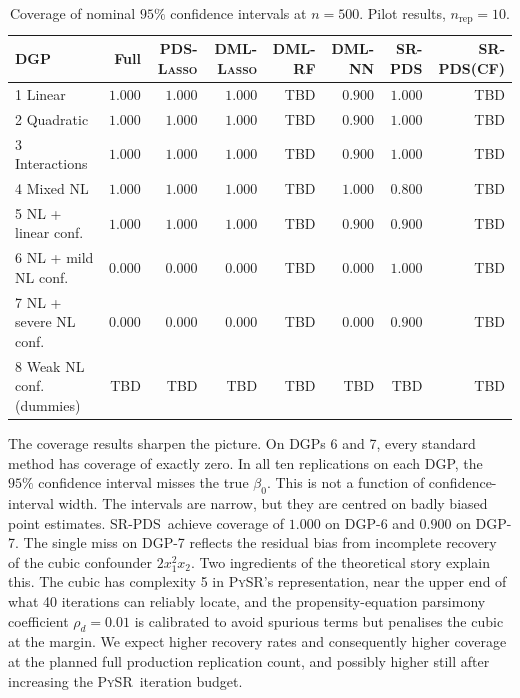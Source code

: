 \documentclass[11pt, a4paper]{article}
\theoremstyle{plain}
\theoremstyle{definition}
\theoremstyle{remark}
\newcommand{\hl}[1]{\cellcolor{highlight}#1}
\newcommand{\lasso}{\textsc{Lasso}}
\newcommand{\pds}{\textsc{PDS}}
\newcommand{\dml}{\textsc{DML}}
\newcommand{\pysr}{\textsc{PySR}}
\newcommand{\epds}{\textsc{SR-PDS}}
\begin{document}
\begin{table}[H]
\centering
\caption{Coverage of nominal $95\%$ confidence intervals at
$n=500$. Pilot results, $n_{\text{rep}} = 10$.}
\label{tab:coverage}
\small
\setlength{\tabcolsep}{4pt}
\begin{tabular}{lrrrrrrr}
    \toprule
    DGP
        & Full
        & \pds-\lasso
        & \dml-\lasso
        & \dml-RF
        & \dml-NN
        & \epds
        & \epds (CF) \\
    \midrule
    1 Linear
        & $1.000$ & $1.000$ & $1.000$ & {\small TBD} & $0.900$ & $1.000$ & {\small TBD} \\
    2 Quadratic
        & $1.000$ & $1.000$ & $1.000$ & {\small TBD} & $0.900$ & $1.000$ & {\small TBD} \\
    3 Interactions
        & $1.000$ & $1.000$ & $1.000$ & {\small TBD} & $0.900$ & $1.000$ & {\small TBD} \\
    4 Mixed NL
        & $1.000$ & $1.000$ & $1.000$ & {\small TBD} & $1.000$ & $0.800$ & {\small TBD} \\
    5 NL + linear conf.
        & $1.000$ & $1.000$ & $1.000$ & {\small TBD} & $0.900$ & $0.900$ & {\small TBD} \\
    6 NL + mild NL conf.
        & $0.000$ & $0.000$ & $0.000$ & {\small TBD} & $0.000$ & \hl{$1.000$} & {\small TBD} \\
    7 NL + severe NL conf.
        & $0.000$ & $0.000$ & $0.000$ & {\small TBD} & $0.000$ & \hl{$0.900$} & {\small TBD} \\
        8 Weak NL conf. (dummies)
        & {\small TBD} & {\small TBD} & {\small TBD} & {\small TBD} & {\small TBD} & {\small TBD} & {\small TBD} \\
    \bottomrule
\end{tabular}
\end{table}

The coverage results sharpen the picture. On DGPs 6 and 7, every
standard method has coverage of exactly zero. In all ten
replications on each DGP, the $95\%$ confidence interval misses
the true $\beta_0$. This is not a function of confidence-interval
width. The intervals are narrow, but they are centred on badly
biased point estimates. \epds\ achieve coverage of
$1.000$ on DGP-6 and $0.900$ on DGP-7. The single miss on DGP-7
reflects the residual bias from incomplete recovery of the cubic
confounder $2 x_1^2 x_2$. Two ingredients of the theoretical
story explain this. The cubic has complexity 5 in \pysr's
representation, near the upper end of what 40 iterations can
reliably locate, and the propensity-equation parsimony coefficient
$\rho_d = 0.01$ is calibrated to avoid spurious terms but
penalises the cubic at the margin. We expect higher recovery
rates and consequently higher coverage at the planned full
production replication count, and possibly higher still after
increasing the \pysr\ iteration budget.
\end{document}
